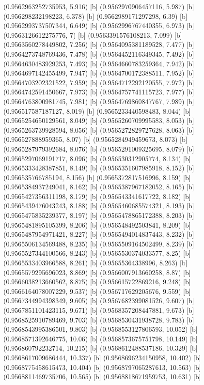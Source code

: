 {{{(0.9562963252735953, 5.916) [b] 
(0.9562970906457116, 5.987) [b] 
(0.956298232198223, 6.378) [b] 
(0.9562989171297298, 6.39) [b] 
(0.9562993737507344, 6.649) [b] 
(0.9562996767440355, 6.973) [b] 
(0.9563126612275776, 7) [b] 
(0.9563391576108213, 7.099) [b] 
(0.9563560278449802, 7.256) [b] 
(0.9564095381189528, 7.477) [b] 
(0.9564273748769436, 7.478) [b] 
(0.9564452116349345, 7.492) [b] 
(0.9564630483929253, 7.493) [b] 
(0.9564660783259364, 7.942) [b] 
(0.9564697142455499, 7.947) [b] 
(0.9564700172388511, 7.952) [b] 
(0.9564703202321522, 7.959) [b] 
(0.9564712292120555, 7.972) [b] 
(0.9564742591450667, 7.973) [b] 
(0.9564757741115723, 7.977) [b] 
(0.9564763800981745, 7.981) [b] 
(0.9564769860847767, 7.989) [b] 
(0.956517587187127, 8.019) [b] 
(0.9565233440598483, 8.044) [b] 
(0.9565254650129561, 8.049) [b] 
(0.9565260709995583, 8.053) [b] 
(0.9565263739928594, 8.056) [b] 
(0.9565272829727628, 8.063) [b] 
(0.956527888959365, 8.07) [b] 
(0.9565284949459673, 8.073) [b] 
(0.9565287979392684, 8.076) [b] 
(0.9565291009325695, 8.079) [b] 
(0.9565297069191717, 8.096) [b] 
(0.956530312905774, 8.134) [b] 
(0.9565333428387851, 8.149) [b] 
(0.9565351607985918, 8.152) [b] 
(0.956535766785194, 8.156) [b] 
(0.9565372817516996, 8.159) [b] 
(0.9565384937249041, 8.162) [b] 
(0.9565387967182052, 8.165) [b] 
(0.9565427356311198, 8.179) [b] 
(0.956543341617722, 8.182) [b] 
(0.9565439476043243, 8.188) [b] 
(0.9565460685574321, 8.193) [b] 
(0.9565475835239377, 8.197) [b] 
(0.9565478865172388, 8.203) [b] 
(0.9565481895105399, 8.206) [b] 
(0.956548492503841, 8.209) [b] 
(0.9565487954971421, 8.227) [b] 
(0.9565494014837443, 8.232) [b] 
(0.9565506134569488, 8.235) [b] 
(0.9565509164502499, 8.239) [b] 
(0.9565527344100566, 8.243) [b] 
(0.9565530374033577, 8.25) [b] 
(0.9565533403966588, 8.261) [b] 
(0.95655364338996, 8.263) [b] 
(0.9565579295696023, 8.869) [b] 
(0.9566007913660258, 8.87) [b] 
(0.9566038213660562, 8.875) [b] 
(0.956615722869216, 9.248) [b] 
(0.9566164078007229, 9.537) [b] 
(0.956717629205676, 9.559) [b] 
(0.9567344994398349, 9.605) [b] 
(0.9567682399081526, 9.607) [b] 
(0.9567851101423115, 9.671) [b] 
(0.9568357208447881, 9.673) [b] 
(0.9568525910789469, 9.703) [b] 
(0.9568530431938728, 9.783) [b] 
(0.9568543995386501, 9.803) [b] 
(0.9568553127806593, 10.052) [b] 
(0.9568571392646775, 10.06) [b] 
(0.9568573675751798, 10.149) [b] 
(0.956860792232714, 10.215) [b] 
(0.9568612488537186, 10.329) [b] 
(0.9568617009686444, 10.337) [b] 
(0.9568696234150958, 10.402) [b] 
(0.9568775458615473, 10.404) [b] 
(0.9568797065287613, 10.563) [b] 
(0.9568811469735706, 10.565) [b] 
(0.9568818671959753, 10.631) [b] 
}}}
